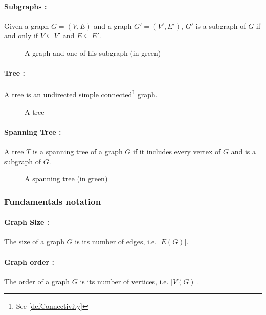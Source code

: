 \paragraph{Subgraphs :}
Given a graph $G = (V,E)$ and a graph $G' = (V',E')$, $G'$ is a subgraph of $G$ 
if and only if $V \subseteq V'$ and $E \subseteq E'$.

\begin{figure}[!h]
  \begin{center}
    
  \end{center}
  \caption{A graph and one of his subgraph (in green)}
\end{figure}

\paragraph{Tree :}
A tree is an undirected simple connected\footnote{See \ref{defConnectivity}}
graph.

\begin{figure}[!h]
  \begin{center}
    
  \end{center}
  \caption{A tree}
\end{figure}

\paragraph{Spanning Tree :}
A tree $T$ is a spanning tree of a graph $G$ if it includes every vertex of $G$ 
and is a subgraph of $G$.

\begin{figure}[!h]
  \begin{center}
    
  \end{center}
  \caption{A spanning tree (in green)}
\end{figure}

\subsubsection{Fundamentals notation}
\paragraph{Graph Size :}
The size of a graph $G$ is its number of edges, i.e. $|E(G)|$.

\paragraph{Graph order :}
The order of a graph $G$ is its number of vertices, i.e. $|V(G)|$.


